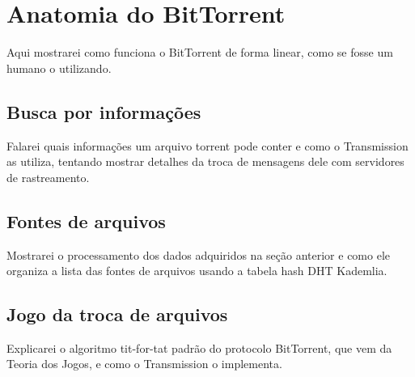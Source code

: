 
\chapter{Anatomia do BitTorrent}

Aqui mostrarei como funciona o BitTorrent de forma linear, como se fosse um humano o utilizando.

\section{Busca por informações}

Falarei quais informações um arquivo torrent pode conter e como o Transmission as utiliza, tentando mostrar detalhes da troca de mensagens dele com servidores de rastreamento.

\section{Fontes de arquivos}

Mostrarei o processamento dos dados adquiridos na seção anterior e como ele organiza a lista das fontes de arquivos usando a tabela hash DHT Kademlia.

\section{Jogo da troca de arquivos}

Explicarei o algoritmo tit-for-tat padrão do protocolo BitTorrent, que vem da Teoria dos Jogos, e como o Transmission o implementa.

\clearpage
